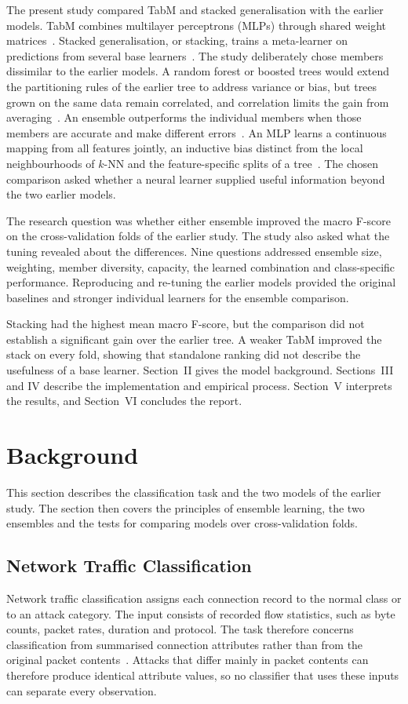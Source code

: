 \documentclass[conference]{IEEEtran}
\newcommand{\knn}{\mbox{$k$-NN}}
\begin{document}
The present study compared TabM and stacked generalisation with the earlier models. TabM combines multilayer perceptrons (MLPs) through shared weight matrices~\cite{gorishniy2025}. Stacked generalisation, or stacking, trains a meta-learner on predictions from several base learners~\cite{wolpert1992}. The study deliberately chose members dissimilar to the earlier models. A random forest or boosted trees would extend the partitioning rules of the earlier tree to address variance or bias, but trees grown on the same data remain correlated, and correlation limits the gain from averaging~\cite{hastie2009}. An ensemble outperforms the individual members when those members are accurate and make different errors~\cite{dietterich2000}. An MLP learns a continuous mapping from all features jointly, an inductive bias distinct from the local neighbourhoods of \knn{} and the feature-specific splits of a tree~\cite{grinsztajn2022}. The chosen comparison asked whether a neural learner supplied useful information beyond the two earlier models.

The research question was whether either ensemble improved the macro F-score on the cross-validation folds of the earlier study. The study also asked what the tuning revealed about the differences. Nine questions addressed ensemble size, weighting, member diversity, capacity, the learned combination and class-specific performance. Reproducing and re-tuning the earlier models provided the original baselines and stronger individual learners for the ensemble comparison.

Stacking had the highest mean macro F-score, but the comparison did not establish a significant gain over the earlier tree. A weaker TabM improved the stack on every fold, showing that standalone ranking did not describe the usefulness of a base learner. Section~II gives the model background. Sections~III and IV describe the implementation and empirical process. Section~V interprets the results, and Section~VI concludes the report.

\section{Background}
This section describes the classification task and the two models of the earlier study. The section then covers the principles of ensemble learning, the two ensembles and the tests for comparing models over cross-validation folds.

\subsection{Network Traffic Classification}
Network traffic classification assigns each connection record to the normal class or to an attack category. The input consists of recorded flow statistics, such as byte counts, packet rates, duration and protocol. The task therefore concerns classification from summarised connection attributes rather than from the original packet contents~\cite{moustafa2015}. Attacks that differ mainly in packet contents can therefore produce identical attribute values, so no classifier that uses these inputs can separate every observation.
\end{document}
